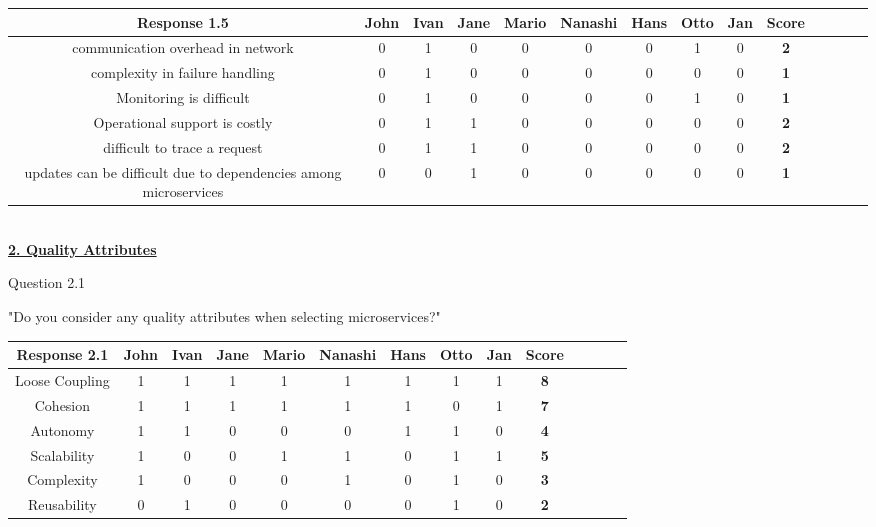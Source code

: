\begin{table}[H]
\centering
\begin{adjustbox}{max width=\textwidth}
\begin{tabular}{*{14}{|c}|}%
\hline
\textbf{Response 1.5}   & John & Ivan & Jane & Mario & Nanashi & Hans & Otto & Jan & \textbf{Score}\\
 \hline
communication overhead in network               & 0 & 1 & 0 & 0 & 0 & 0 & 1 & 0 & \textbf{2}    \\ 
 \hline
complexity in failure handling  & 0 & 1 & 0 & 0 & 0 & 0 & 0 & 0 & \textbf{1} \\ 
 \hline
Monitoring is difficult           & 0 & 1 & 0 & 0 & 0 & 0 & 1 & 0 & \textbf{1} \\ 
 \hline
 Operational support is costly           & 0 & 1 & 1 & 0 & 0 & 0 & 0 & 0 & \textbf{2} \\ 
 \hline
 difficult to trace a request           & 0 & 1 & 1 & 0 & 0 & 0 & 0 & 0 & \textbf{2} \\ 
 \hline
 updates can be difficult due to dependencies among microservices          & 0 & 0 & 1 & 0 & 0 & 0 & 0 & 0 & \textbf{1} \\ 
 \hline
 \hline
\end{tabular}
\end{adjustbox}
\label{tab:hybris_architecture/interview/question_1.5}
\end{table}
\\


\textbf{\underline{2. Quality Attributes}}\\
\begin{shaded} Question 2.1 \end{shaded} \label{question:hybris_architecture/interview/question_2.1}
"Do you consider any quality attributes when selecting microservices?"\\
\begin{table}[H]
\centering
\begin{adjustbox}{max width=\textwidth}
\begin{tabular}{*{14}{|c}|}%
\hline
\textbf{Response 2.1}   & John & Ivan & Jane & Mario & Nanashi & Hans & Otto & Jan & \textbf{Score}\\
 \hline
Loose Coupling          & 1 & 1 & 1 & 1 & 1 & 1 & 1 & 1 & \textbf{8}    \\ 
 \hline
Cohesion                & 1 & 1 & 1 & 1 & 1 & 1 & 0 & 1 & \textbf{7}    \\ 
 \hline
 Autonomy               & 1 & 1 & 0 & 0 & 0 & 1 & 1 & 0 & \textbf{4}    \\ 
 \hline
 Scalability            & 1 & 0 & 0 & 1 & 1 & 0 & 1 & 1 & \textbf{5}    \\ 
 \hline
 Complexity             & 1 & 0 & 0 & 0 & 1 & 0 & 1 & 0 & \textbf{3}    \\ 
 \hline
 Reusability            & 0 & 1 & 0 & 0 & 0 & 0 & 1 & 0 & \textbf{2}    \\ 
 \hline
 \hline
\end{tabular}
\end{adjustbox}
\label{tab:hybris_architecture/interview/question_2.1}
\end{table}
\\


